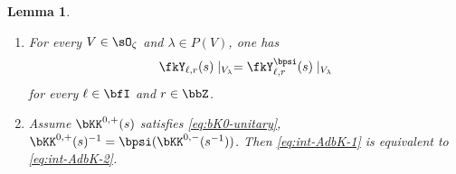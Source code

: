 \documentclass[reqno]{amsart}
\numberwithin{equation}{section}
\newtheorem*{lemma}{Lemma}
\begin{document}
\begin{lemma}\label{lem:bK0-intertwining}
\hfill
\begin{enumerate}[leftmargin=2em]\itemsep0.25cm
	\item For every $V\in\sO_\zeta$ and $\lambda\in P(V)$, one has
	\begin{equation}
	\fkY_{\ell,r}(s)\mid_{V_\lambda}
	=\fkY^{\bpsi}_{\ell,r}(s)\mid_{V_\lambda}
	\end{equation} 
	for every $\ell\in\bfI$ and $r\in\bbZ$.
	\item 
	Assume $\bKK^{0,+}(s)$ satisfies \eqref{eq:bK0-unitary}, \ie $\bKK^{0,+}(s)^{-1}=\bpsi(\bKK^{0,-}(s^{-1}))$. Then \eqref{eq:int-AdbK-1} is equivalent to \eqref{eq:int-AdbK-2}.
\end{enumerate}
\end{lemma}
\end{document}
